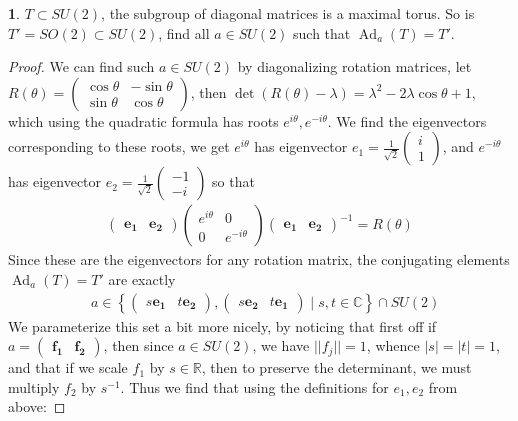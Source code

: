 \documentclass[10.5pt]{article}
\theoremstyle{definition}
\newtheorem{pb}{}
\newcommand{\set}[1]{\left\{#1\right\}}
\newcommand{\abs}[1]{\left\vert#1\right\vert}
\newcommand{\norm}[1]{\lvert\lvert#1\rvert\rvert}
\begin{document}
    \begin{pb}
        \(T \subset SU(2)\), the subgroup of diagonal matrices is a maximal torus. So is \(T' = SO(2) \subset SU(2)\), find all \(a \in SU(2)\) such that \(\operatorname{Ad}_a(T) = T'\).
        \begin{proof}
            We can find such \(a \in SU(2)\) by diagonalizing rotation matrices, let \(R(\theta) = \begin{pmatrix} \cos\theta & -\sin\theta \\ \sin\theta & \cos\theta \end{pmatrix}\), then \(\det(R(\theta) - \lambda) = \lambda^2 - 2\lambda\cos\theta + 1\), which using the quadratic formula has roots \(e^{i\theta},e^{-i\theta}\). We find the eigenvectors corresponding to these roots, we get \(e^{i\theta}\) has eigenvector \(e_1 = \frac{1}{\sqrt{2}}\begin{pmatrix} i  \\ 1 \end{pmatrix}\), and \(e^{-i\theta}\) has eigenvector \(e_2 = \frac{1}{\sqrt{2}}\begin{pmatrix} -1  \\ -i \end{pmatrix}\) so that
            \begin{align*}
                \begin{pmatrix} \mathbf{e_1} & \mathbf{e_2}\end{pmatrix}\begin{pmatrix} e^{i\theta} & 0 \\ 0 & e^{-i\theta} \end{pmatrix}\begin{pmatrix} \mathbf{e_1} & \mathbf{e_2} \end{pmatrix}^{-1} = R(\theta)
            \end{align*}
            Since these are the eigenvectors for any rotation matrix, the conjugating elements \(\operatorname{Ad}_a(T) = T'\) are exactly
            \begin{align*}
                &a \in \set{\begin{pmatrix}
                    s\mathbf{e_1} & t\mathbf{e_2}
                \end{pmatrix}, \begin{pmatrix}
                    s\mathbf{e_2} & t\mathbf{e_1}
                \end{pmatrix} \mid s,t \in \mathbb{C}} \cap SU(2)
            \end{align*}
            We parameterize this set a bit more nicely, by noticing that first off if \(a = \begin{pmatrix} \mathbf{f_1} & \mathbf{f_2}\end{pmatrix}\), then since \(a \in SU(2)\), we have \(\norm{f_j} = 1\), whence \(\abs{s} = \abs{t} = 1\), and that if we scale \(f_1\) by \(s \in \mathbb{R}\), then to preserve the determinant, we must multiply \(f_2\) by \(s^{-1}\). Thus we find that using the definitions for \(e_1, e_2\) from above:

\end{proof}
\end{pb}
\end{document}
